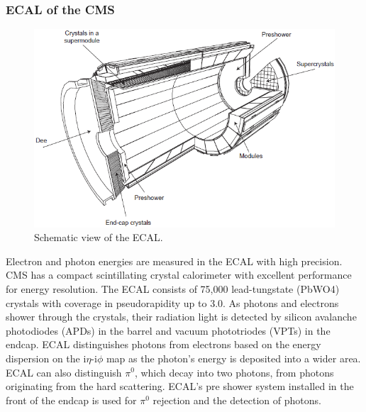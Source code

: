 \subsubsection{ECAL of the CMS}
\begin{figure}[h!]
  \caption{Schematic view of the ECAL. \cite{ecal}}
  \label{fig:ECAL}
  \centering
  \includegraphics[width=0.87\linewidth]{figs/ECAL.png}
\end{figure}
Electron and photon energies are measured in the ECAL with high precision. 
CMS has a compact scintillating crystal calorimeter with excellent performance for energy resolution. 
The ECAL consists of 75,000 lead-tungstate (PbWO4) crystals with coverage in pseudorapidity up to 3.0. As photons and electrons shower through the crystals, their radiation light is detected by silicon avalanche photodiodes (APDs) in the barrel and vacuum phototriodes (VPTs) in the endcap.
ECAL distinguishes photons from electrons based on the energy dispersion on the i$\eta$-i$\phi$ map as the photon's energy is deposited into a wider area.
ECAL can also distinguish $\pi^{0}$, which decay into two photons, from photons originating from the hard scattering.
ECAL's pre shower system installed in the front of the endcap is used for $\pi^{0}$ rejection and the detection of photons.

